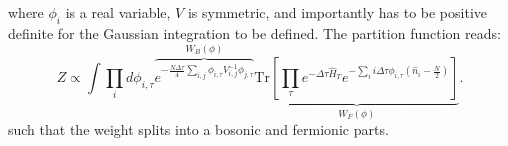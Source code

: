 where $\phi_i $ is a  real  variable, $V$ is symmetric, and importantly has to be  positive definite  for the Gaussian integration to be defined. 
The partition function  reads:
\begin{equation}
	Z \propto \int \prod_{i} d \phi_{i, \tau} \overbrace{e^{ - \frac{N \Delta \tau} {4} \sum_{i,j} \phi_{i,\tau} V^{-1}_{i,j}  \phi_{j,\tau}} }^{W_B(\phi)}\underbrace{\text{Tr} \left[   \prod_{\tau}   
	 e^{-\Delta \tau \hat{H}_T}  e^{- \sum_{i}  i \Delta \tau \phi_{i,\tau} \left( \hat{n}_{i} - \frac{N}{2} \right) }\right]}_{W_F(\phi)}.
\end{equation}
such that the weight splits into a bosonic and fermionic parts. 
 
 
